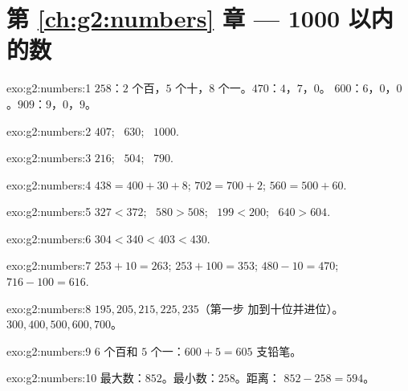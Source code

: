 \section*{第 \ref{ch:g2:numbers} 章 --- 1000 以内的数}

\begin{solution}{exo:g2:numbers:1}
$258$：$2$ 个百，$5$ 个十，$8$ 个一。$470$：$4$，$7$，$0$。
$600$：$6$，$0$，$0$。$909$：$9$，$0$，$9$。
\end{solution}

\begin{solution}{exo:g2:numbers:2}
$407$; \ $630$; \ $1000$.
\end{solution}

\begin{solution}{exo:g2:numbers:3}
$216$; \ $504$; \ $790$.
\end{solution}

\begin{solution}{exo:g2:numbers:4}
$438 = 400 + 30 + 8$; \quad $702 = 700 + 2$; \quad
$560 = 500 + 60$.
\end{solution}

\begin{solution}{exo:g2:numbers:5}
$327 < 372$; \ $580 > 508$; \ $199 < 200$; \ $640 > 604$.
\end{solution}

\begin{solution}{exo:g2:numbers:6}
$304 < 340 < 403 < 430$.
\end{solution}

\begin{solution}{exo:g2:numbers:7}
$253 + 10 = 263$; \quad $253 + 100 = 353$; \quad
$480 - 10 = 470$; \quad $716 - 100 = 616$.
\end{solution}

\begin{solution}{exo:g2:numbers:8}
$195, 205, 215, 225, 235$（第一步
加到十位并进位）。$300, 400, 500, 600, 700$。
\end{solution}

\begin{solution}{exo:g2:numbers:9}
$6$ 个百和 $5$ 个一：$600 + 5 = 605$ 支铅笔。
\end{solution}

\begin{solution}{exo:g2:numbers:10}
最大数：$852$。最小数：$258$。距离：
$852 - 258 = 594$。
\end{solution}
